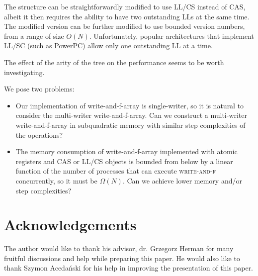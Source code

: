 \documentclass[a4paper,11pt]{article}
\newcommand{\fn}[1]{\textsc{#1}}
\begin{document}
The structure can be straightforwardly modified to use LL/CS instead of CAS, albeit it then requires the ability to have two outstanding LLs at the same time. The modified version can be further modified to use
bounded version numbers, from a range of size $O(N)$. Unfortunately, popular architectures that implement LL/SC (such as PowerPC) allow only one outstanding LL at a time.

The effect of the arity of the tree on the performance
seems to be worth investigating.

We pose two problems:

\begin{itemize}
	\item Our implementation of write-and-f-array is single-writer, so it is natural to consider the multi-writer write-and-f-array. Can we construct a multi-writer write-and-f-array in subquadratic memory with similar step complexities of the operations?

	\item The memory consumption of write-and-f-array implemented with atomic registers and CAS or LL/CS objects is bounded from below by a linear function of the number of processes that can execute \fn{write-and-f} concurrently\cite{lowerbound}, so it must be $\Omega(N)$. Can we achieve lower memory and/or step complexities?
\end{itemize}

\section{Acknowledgements}
The author would like to thank his advisor, dr. Grzegorz Herman for many fruitful discussions and help while preparing this paper. He would also like to thank Szymon Acedański for his help in improving the presentation of this paper.
\end{document}
